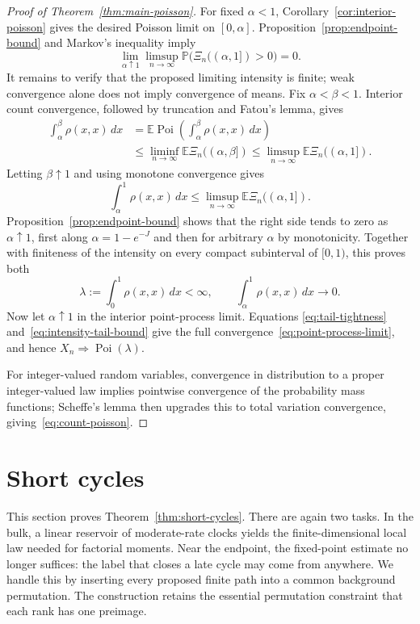 \documentclass[11pt]{article}
\theoremstyle{remark}
\theoremstyle{plain}
\newcommand{\E}{\mathbb E}
\newcommand{\Pp}{\mathbb P}
\newcommand{\Poi}{\operatorname{Poi}}
\begin{document}
\begin{proof}[Proof of Theorem~\ref{thm:main-poisson}]
For fixed $\alpha<1$, Corollary~\ref{cor:interior-poisson} gives the desired
Poisson limit on $[0,\alpha]$.  Proposition~\ref{prop:endpoint-bound} and
Markov's inequality imply
\begin{equation}\label{eq:tail-tightness}
 \lim_{\alpha\uparrow1}\limsup_{n\to\infty}
 \Pp\bigl(\Xi_n((\alpha,1])>0\bigr)=0.
\end{equation}
It remains to verify that the proposed limiting intensity is finite; weak
convergence alone does not imply convergence of means.  Fix
$\alpha<\beta<1$.  Interior count convergence, followed by truncation and
Fatou's lemma, gives
\begin{align*}
 \int_\alpha^\beta\rho(x,x)\,dx
 &=\E\Poi\left(\int_\alpha^\beta\rho(x,x)\,dx\right)\\
 &\le\liminf_{n\to\infty}\E\Xi_n((\alpha,\beta])
 \le\limsup_{n\to\infty}\E\Xi_n((\alpha,1]).
\end{align*}
Letting $\beta\uparrow1$ and using monotone convergence gives
\[
 \int_\alpha^1\rho(x,x)\,dx
 \le\limsup_{n\to\infty}\E\Xi_n((\alpha,1]).
\]
Proposition~\ref{prop:endpoint-bound} shows that the right side tends to zero
as $\alpha\uparrow1$, first along $\alpha=1-e^{-J}$ and then for arbitrary
$\alpha$ by monotonicity.  Together with finiteness of the intensity on every
compact subinterval of $[0,1)$, this proves both
\begin{equation}\label{eq:intensity-tail-bound}
 \lambda:=\int_0^1\rho(x,x)\,dx<\infty,
 \qquad
 \int_\alpha^1\rho(x,x)\,dx\longrightarrow0.
\end{equation}
Now let $\alpha\uparrow1$ in the interior point-process limit.  Equations
\eqref{eq:tail-tightness} and~\eqref{eq:intensity-tail-bound} give the full
convergence~\eqref{eq:point-process-limit}, and hence
$X_n\Rightarrow\Poi(\lambda)$.

For integer-valued random variables, convergence in distribution to a proper
integer-valued law implies pointwise convergence of the probability mass
functions; Scheffe's lemma then upgrades this to total variation convergence,
giving~\eqref{eq:count-poisson}.
\end{proof}

\section{Short cycles}\label{sec:short-cycles}

This section proves Theorem~\ref{thm:short-cycles}.  There are again two
tasks.  In the bulk, a linear reservoir of moderate-rate clocks yields the
finite-dimensional local law needed for factorial moments.  Near the
endpoint, the fixed-point estimate no longer suffices: the label that closes
a late cycle may come from anywhere.  We handle this by inserting every
proposed finite path into a common background permutation.  The construction
retains the essential permutation constraint that each rank has one
preimage.
\end{document}

